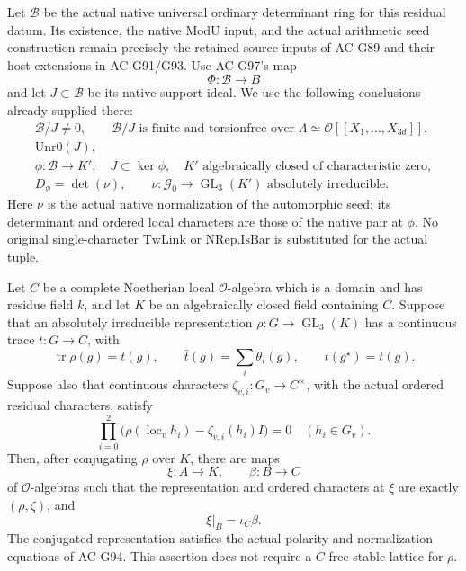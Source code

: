Let \(\mathscr B\) be the actual native universal ordinary
determinant ring for this residual datum.  Its existence,
the native \(\mathrm{ModU}\) input, and the actual arithmetic
seed construction remain precisely the retained source inputs
of AC-G89 and their host extensions in AC-G91/G93.
Use AC-G97's map
\[
                  \Phi:\mathscr B\longrightarrow B
 \tag{G107.3}
\]
and let \(J\subset\mathscr B\) be its native support ideal.
We use the following conclusions already supplied there:
\[
 \begin{gathered}
 \mathscr B/J\ne0,\qquad
 \mathscr B/J\text{ is finite and torsionfree over }
 \Lambda\simeq\mathcal O[[X_1,\ldots,X_{3d}]],\\
 \mathrm{Unr0}(J),\\
 \phi:\mathscr B\longrightarrow K',\quad J\subset\ker\phi,
 \quad K'\text{ algebraically closed of characteristic zero},\\
 D_{\phi}=\det(\nu),\qquad
 \nu:\mathcal G_0\longrightarrow\operatorname{GL}_3(K')
       \text{ absolutely irreducible}.
 \end{gathered}
 \tag{G107.4}
\]
Here \(\nu\) is the actual native normalization of the
automorphic seed; its determinant and ordered local characters
are those of the native pair at \(\phi\).
No original single-character \(\mathrm{TwLink}\) or
\(\mathrm{NRep.IsBar}\) is substituted for the actual tuple.

\begin{lemma}
\label{AC-G107-integral}
Let \(C\) be a complete Noetherian local
\(\mathcal O\)-algebra which is a domain and has residue field
\(k\), and let \(K\) be an algebraically closed field containing
\(C\).  Suppose that an absolutely irreducible representation
\(\rho:G\to\operatorname{GL}_3(K)\) has a continuous trace
\(t:G\to C\), with
\[
 \operatorname{tr}\rho(g)=t(g),\qquad
 \bar t(g)=\sum_i\theta_i(g),\qquad
 t(g^\star)=t(g).
 \tag{G107.5}
\]
Suppose also that continuous characters
\(\zeta_{v,i}:G_v\to C^\times\), with the actual ordered
residual characters, satisfy
\[
 \prod_{i=0}^2
 \bigl(\rho(\operatorname{loc}_v h_i)
                      -\zeta_{v,i}(h_i)I\bigr)=0
       \quad(h_i\in G_v).
 \tag{G107.6}
\]
Then, after conjugating \(\rho\) over \(K\), there are maps
\[
 \xi:A\longrightarrow K,\qquad \beta:B\longrightarrow C
 \tag{G107.7}
\]
of \(\mathcal O\)-algebras such that the representation and
ordered characters at \(\xi\) are exactly
\((\rho,\zeta)\), and
\[
                   \xi|_B=\iota_C\beta .
 \tag{G107.8}
\]
The conjugated representation satisfies the actual polarity
and normalization equations of AC-G94.  This assertion
does not require a \(C\)-free stable lattice for \(\rho\).
\end{lemma}

